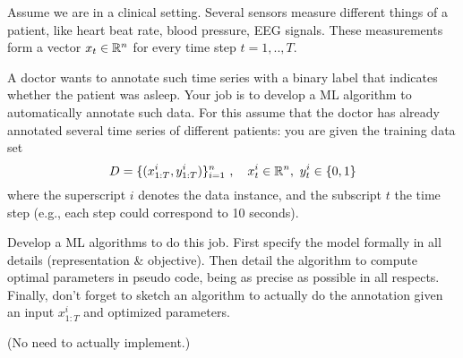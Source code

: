 Assume we are in a clinical setting. Several sensors measure
different things of a patient, like heart beat rate, blood pressure,
EEG signals. These measurements form a vector $x_t\in{\mathbb{R}}^n$ for every
time step $t=1,..,T$.

A doctor wants to annotate such time series with a binary label that
indicates whether the patient was asleep. Your job is to develop a ML
algorithm to automatically annotate such data. For this assume that
the doctor has already annotated several time series of different
patients: you are given the training data set
$$ D = \{ (x^i_{1:T}, y^i_{1:T}) \}_{i=1}^n ~,\quad x^i_t\in{\mathbb{R}}^n,~
y^i_t\in\{0,1\} $$
where the superscript $i$ denotes the data instance, and the subscript
$t$ the time step (e.g., each step could correspond to 10 seconds).

Develop a ML algorithms to do this job. First specify the model
formally in all details (representation \& objective). Then detail the
algorithm to compute optimal parameters in pseudo code, being as
precise as possible in all respects. Finally, don't forget to sketch
an algorithm to actually do the annotation given an input $x^i_{1:T}$
and optimized parameters.

(No need to actually implement.)


\exerfoot
